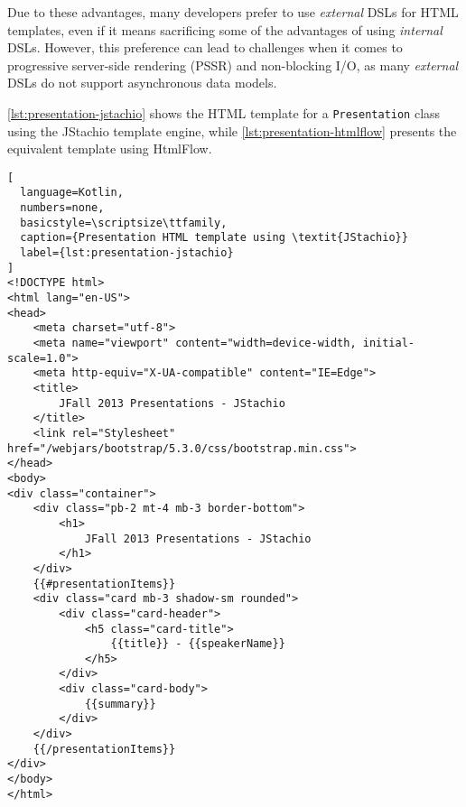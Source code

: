 Due to these advantages, many developers prefer to use \textit{external} DSLs
for HTML templates, even if it means sacrificing some of the advantages of
using \textit{internal} DSLs. However, this preference can lead to challenges
when it comes to progressive server-side rendering (PSSR) and non-blocking I/O,
as many \textit{external} DSLs do not support asynchronous data models.

\autoref{lst:presentation-jstachio} shows the HTML template for a \texttt{Presentation} class using the JStachio template engine, 
while \autoref{lst:presentation-htmlflow} presents the equivalent template using HtmlFlow.

\lstset{style=listingstyle}
\begin{lstlisting}[
  language=Kotlin,
  numbers=none,
  basicstyle=\scriptsize\ttfamily,
  caption={Presentation HTML template using \textit{JStachio}}
  label={lst:presentation-jstachio}
]
<!DOCTYPE html>
<html lang="en-US">
<head>
    <meta charset="utf-8">
    <meta name="viewport" content="width=device-width, initial-scale=1.0">
    <meta http-equiv="X-UA-compatible" content="IE=Edge">
    <title>
        JFall 2013 Presentations - JStachio
    </title>
    <link rel="Stylesheet" href="/webjars/bootstrap/5.3.0/css/bootstrap.min.css">
</head>
<body>
<div class="container">
    <div class="pb-2 mt-4 mb-3 border-bottom">
        <h1>
            JFall 2013 Presentations - JStachio
        </h1>
    </div>
    {{#presentationItems}}
    <div class="card mb-3 shadow-sm rounded">
        <div class="card-header">
            <h5 class="card-title">
                {{title}} - {{speakerName}}
            </h5>
        </div>
        <div class="card-body">
            {{summary}}
        </div>
    </div>
    {{/presentationItems}}
</div>
</body>
</html>
\end{lstlisting}
\vspace{0.5cm}
